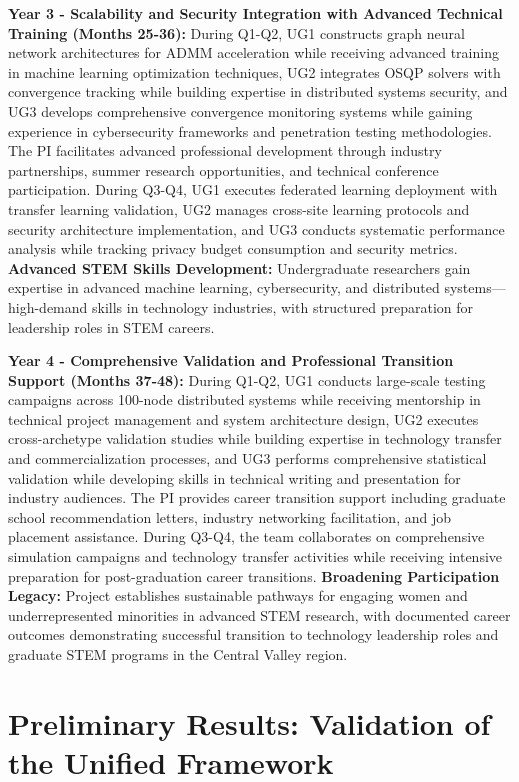 \documentclass[12pt]{article}
\begin{document}
\textbf{Year 3 - Scalability and Security Integration with Advanced Technical Training (Months 25-36):} During Q1-Q2, UG1 constructs graph neural network architectures for ADMM acceleration while receiving advanced training in machine learning optimization techniques, UG2 integrates OSQP solvers with convergence tracking while building expertise in distributed systems security, and UG3 develops comprehensive convergence monitoring systems while gaining experience in cybersecurity frameworks and penetration testing methodologies. The PI facilitates advanced professional development through industry partnerships, summer research opportunities, and technical conference participation. During Q3-Q4, UG1 executes federated learning deployment with transfer learning validation, UG2 manages cross-site learning protocols and security architecture implementation, and UG3 conducts systematic performance analysis while tracking privacy budget consumption and security metrics. \textbf{Advanced STEM Skills Development:} Undergraduate researchers gain expertise in advanced machine learning, cybersecurity, and distributed systems—high-demand skills in technology industries, with structured preparation for leadership roles in STEM careers.

\textbf{Year 4 - Comprehensive Validation and Professional Transition Support (Months 37-48):} During Q1-Q2, UG1 conducts large-scale testing campaigns across 100-node distributed systems while receiving mentorship in technical project management and system architecture design, UG2 executes cross-archetype validation studies while building expertise in technology transfer and commercialization processes, and UG3 performs comprehensive statistical validation while developing skills in technical writing and presentation for industry audiences. The PI provides career transition support including graduate school recommendation letters, industry networking facilitation, and job placement assistance. During Q3-Q4, the team collaborates on comprehensive simulation campaigns and technology transfer activities while receiving intensive preparation for post-graduation career transitions. \textbf{Broadening Participation Legacy:} Project establishes sustainable pathways for engaging women and underrepresented minorities in advanced STEM research, with documented career outcomes demonstrating successful transition to technology leadership roles and graduate STEM programs in the Central Valley region.

\section{Preliminary Results: Validation of the Unified Framework}
\end{document}
